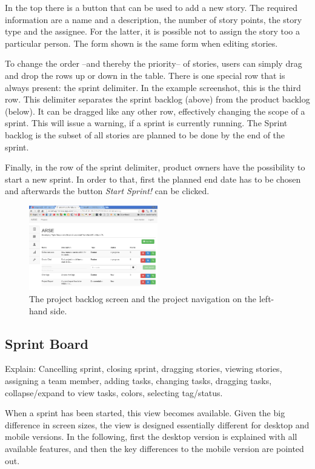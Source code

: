 \documentclass[
	accentcolor=tud1a %
]{tudreport}
\begin{document}
In the top there is a button that can be used to add a new story. The required information are a name and a description, the number of story points, the story type and the assignee. For the latter, it is possible not to assign the story too a particular person. The form shown is the same form when editing stories.

To change the order --and thereby the priority-- of stories, users can simply drag and drop the rows up or down in the table. There is one special row that is always present: the sprint delimiter. In the example screenshot, this is the third row. This delimiter separates the sprint backlog (above) from the product backlog (below). It can be dragged like any other row, effectively changing the scope of a sprint. This will issue a warning, if a sprint is currently running. The Sprint backlog is the subset of all stories are planned to be done by the end of the sprint.

Finally, in the row of the sprint delimiter, product owners have the possibility to start a new sprint. In order to that, first the planned end date has to be chosen and afterwards the button \emph{Start Sprint!} can be clicked.

\begin{figure}[ht]
	\centering
	\includegraphics[width=0.5\textwidth]{img/backlog}
	\caption{The project backlog screen and the project navigation on the left-hand side.}
	\label{fig:project-backlog}
\end{figure}

\subsection{Sprint Board}
\label{sec:sprint-board}

Explain: Cancelling sprint, closing sprint, dragging stories, viewing stories, assigning a team member, adding tasks, changing tasks, dragging tasks, collapse/expand to view tasks, colors, selecting tag/status.

When a sprint has been started, this view becomes available. Given the big difference in screen sizes, the view is designed essentially different for desktop and mobile versions. In the following, first the desktop version is explained with all available features, and then the key differences to the mobile version are pointed out.
\end{document}
